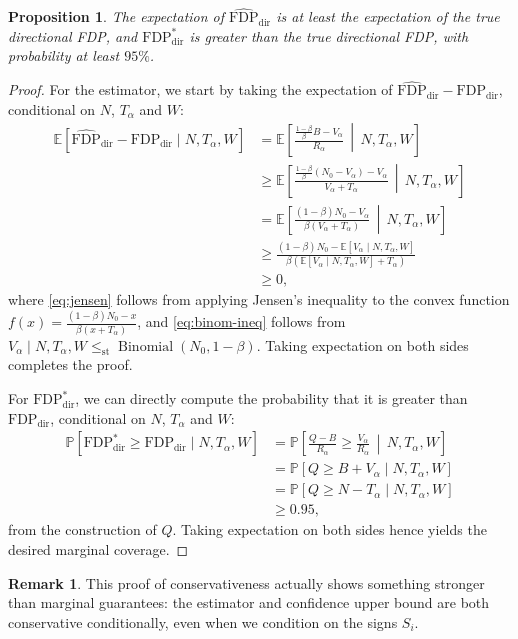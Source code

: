\documentclass[11pt]{article}
\newtheorem{proposition}[corollary]{Proposition}
\theoremstyle{definition}
\newtheorem*{remark}{Remark}
\theoremstyle{custom}
\newcommand{\EE}{\mathbb{E}}
\newcommand{\PP}{\mathbb{P}}
\DeclareMathOperator{\Binomial}{Binomial}
\newcommand{\FDPd}{\text{FDP}_\text{dir}}
\newcommand{\hFDPd}{\widehat{\text{FDP}}_\text{dir}}
\newcommand{\lest}{\le_\text{st}}
\begin{document}
  \begin{proposition}
    The expectation of $\hFDPd$ is at least the expectation of the true directional FDP, and $\FDPd^*$ is greater than the true directional FDP, with probability at least $95\%$.
    \label{prop:prereg-test}
  \end{proposition}
  \begin{proof}
    For the estimator, we start by taking the expectation of $\hFDPd - \FDPd$, conditional on $N$, $T_\alpha$ and $W$:
    \begin{align}
      \EE[\hFDPd - \FDPd \mid N, T_\alpha, W] &= \EE\left[\frac{\frac{1-\beta}{\beta} B - V_\alpha}{R_\alpha} \,\middle|\, N, T_\alpha, W\right] \nonumber \\
      &\ge \EE\left[\frac{\frac{1-\beta}{\beta} (N_0 - V_\alpha) - V_\alpha}{V_\alpha + T_\alpha} \,\middle|\, N, T_\alpha, W\right] \nonumber \\
      &= \EE\left[\frac{(1-\beta) N_0 - V_\alpha}{\beta (V_\alpha + T_\alpha)} \,\middle|\, N, T_\alpha, W\right] \nonumber \\
      &\ge \frac{(1-\beta) N_0 - \EE[V_\alpha \mid N, T_\alpha, W]}{\beta (\EE[V_\alpha \mid N, T_\alpha, W] + T_\alpha)} \label{eq:jensen} \\
      &\ge 0 \label{eq:binom-ineq},
    \end{align}
    where \eqref{eq:jensen} follows from applying Jensen's inequality to the convex function $f(x) = \frac{(1-\beta) N_0 - x}{\beta(x + T_\alpha)}$, and \eqref{eq:binom-ineq} follows from $V_\alpha \mid N, T_\alpha, W \lest \Binomial(N_0, 1-\beta)$. Taking expectation on both sides completes the proof.

    For $\FDPd^*$, we can directly compute the probability that it is greater than $\FDPd$, conditional on $N$, $T_\alpha$ and $W$:
    \begin{align*}
      \PP[\FDPd^* \ge \FDPd \mid N, T_\alpha, W] &= \PP\left[\frac{Q - B}{R_\alpha} \ge \frac{V_\alpha}{R_\alpha} \,\middle|\, N, T_\alpha, W\right] \\
      &= \PP[Q \ge B + V_\alpha \mid N, T_\alpha, W] \\
      &= \PP[Q \ge N - T_\alpha \mid N, T_\alpha, W] \\
      &\ge 0.95,
    \end{align*}
    from the construction of $Q$. Taking expectation on both sides hence yields the desired marginal coverage.
  \end{proof}

  \begin{remark}
    This proof of conservativeness actually shows something stronger than marginal guarantees: the estimator and confidence upper bound are both conservative conditionally, even when we condition on the signs $S_i$.
  \end{remark}
\end{document}
